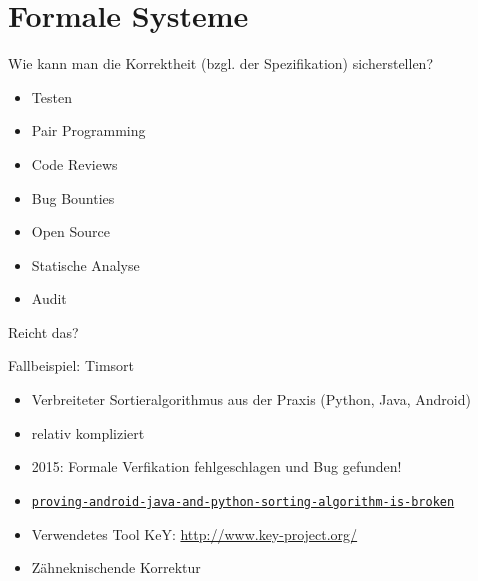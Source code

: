 \documentclass[aspectratio=169]{beamer}
\begin{document}
\section{Formale Systeme}
\begin{frame}
  Wie kann man die Korrektheit (bzgl. der Spezifikation) sicherstellen?
  \vfill
  \begin{itemize}
  \item Testen
  \item Pair Programming
  \item Code Reviews
  \item Bug Bounties
  \item Open Source
  \item Statische Analyse 
  \item Audit \pause
  \end{itemize}
  \vfill
  \begin{center}
    Reicht das? 
  \end{center}
\end{frame}
\begin{frame}
  \begin{center}
    \Large{Fallbeispiel: Timsort}
  \end{center}
  \begin{itemize}
  \item Verbreiteter Sortieralgorithmus aus der Praxis (Python, Java, Android)
  \item relativ kompliziert
  \item 2015: Formale Verfikation fehlgeschlagen und Bug gefunden!
  \item \href{http://envisage-project.eu/proving-android-java-and-python-sorting-algorithm-is-broken-and-how-to-fix-it/}{\texttt{proving-android-java-and-python-sorting-algorithm-is-broken}}
  \item Verwendetes Tool KeY: \url{http://www.key-project.org/}
  \item Zähneknischende Korrektur
  \end{itemize}
\end{frame}
\end{document}
